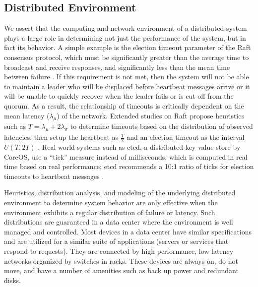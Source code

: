 \documentclass[letterpaper,twocolumn,10pt]{article}
\begin{document}
\subsection{Distributed Environment}

We assert that the computing and network environment of a distributed system plays a large role in determining not just the performance of the system, but in fact its behavior. A simple example is the election timeout parameter of the Raft consensus protocol, which must be significantly greater than the average time to broadcast and receive responses, and significantly less than the mean time between failure \cite{ongaro_search_2014}. If this requirement is not met, then the system will not be able to maintain a leader who will be displaced before heartbeat messages arrive or it will be unable to quickly recover when the leader fails or is cut off from the quorum. As a result, the relationship of timeouts is critically dependent on the mean latency ($\lambda_{\mu}$) of the network. Extended studies on Raft propose heuristics such as $T = \lambda_{\mu} + 2\lambda_{\sigma}$ to determine timeouts based on the distribution of observed latencies, then setup the heartbeat as $\frac {T} {2}$ and an election timeout as the interval $U(T,2T)$ \cite{howard_raft_2015}. Real world systems such as etcd, a distributed key-value store by CoreOS, use a ``tick'' measure instead of milliseconds, which is computed in real time based on real performance; etcd recommends a 10:1 ratio of ticks for election timeouts to heartbeat messages \cite{mizerany_etcd_2016}.


Heuristics, distribution analysis, and modeling of the underlying distributed environment to determine system behavior are only effective when the environment exhibits a regular distribution of failure or latency. Such distributions are guaranteed in a data center where the environment is well managed and controlled. Most devices in a data center have similar specifications and are utilized for a similar suite of applications (servers or services that respond to requests). They are connected by high performance, low latency networks organized by switches in racks. These devices are always on, do not move, and have a number of amenities such as back up power and redundant disks.
\end{document}
